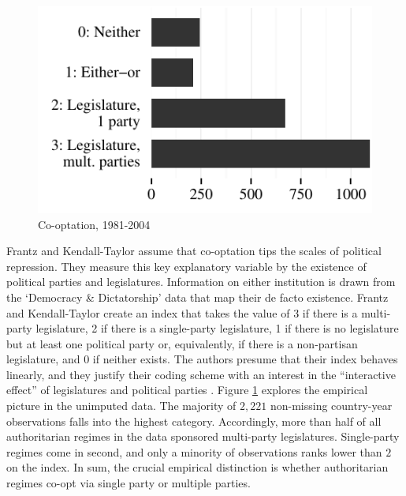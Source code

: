 \begin{figure}
\centering
\includegraphics[width=\linewidth]{./sections/02data/barCooptation.pdf}
\caption{Co-optation, 1981-2004}
\label{fig:barCooptation}
\end{figure}
Frantz and Kendall-Taylor assume that co-optation tips the 
scales of political repression. They measure this key 
explanatory variable by the existence of political parties 
and legislatures. Information on either institution is drawn 
from the `Democracy \& Dictatorship' data 
\citep{Cheibub.2010} that map their de facto existence. 
Frantz and Kendall-Taylor create an index that takes the 
value of 3 if there is a multi-party legislature, 
2 if there is a single-party legislature, 1 if there is no 
legislature but at least one political party or, 
equivalently, if there is a non-partisan legislature, and 0 
if neither exists. The authors presume that their index 
behaves linearly, and they justify their coding scheme with 
an interest in the ``interactive effect'' of legislatures 
and political parties \citep[338]{Frantz.2014}. Figure 
\ref{fig:barCooptation} explores the empirical picture in 
the unimputed data. The majority of $2,221$ non-missing 
country-year observations falls into the highest 
category. Accordingly, more than half of all authoritarian
regimes in the data sponsored multi-party legislatures. 
Single-party regimes come in second, and only a minority of
observations ranks lower than $2$ on the index. In sum, 
the crucial empirical distinction is whether authoritarian 
regimes co-opt via single party or multiple parties.